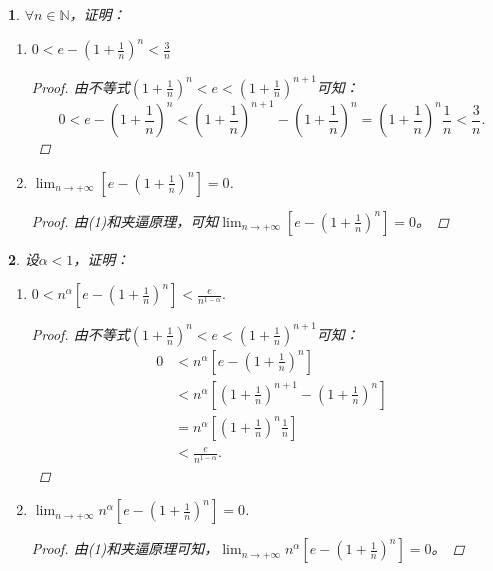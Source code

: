 \documentclass[utf8]{book}
\newtheorem{example}{}[section]             %
\begin{document}
\begin{example}
$\forall n\in\mathbb{N}$，证明：
\renewcommand\labelenumi{\normalfont(\theenumi)}
\begin{enumerate}
\item $0<e-\left(1+\frac{1}{n}\right)^n <\frac{3}{n}$
\begin{proof}
由不等式$\left(1+\frac{1}{n}\right)^n<e<\left(1+\frac{1}{n}\right)^{n+1}$可知：
$$0<e-\left(1+\frac{1}{n}\right)^n < \left(1+\frac{1}{n}\right)^{n+1} - \left(1+\frac{1}{n}\right)^{n}=\left(1+\frac{1}{n}\right)^{n}\frac{1}{n}<\frac{3}{n}.$$
\end{proof}
\item $\displaystyle \lim_{n\to +\infty}\left[e-\left(1+\frac{1}{n}\right)^n\right]=0$.
\begin{proof}
由(1)和夹逼原理，可知$\displaystyle \lim_{n\to +\infty}\left[e-\left(1+\frac{1}{n}\right)^n\right] = 0$。
\end{proof}
\end{enumerate}
\end{example}
\begin{example}
设$\alpha<1$，证明：
\renewcommand\labelenumi{\normalfont(\theenumi)}
\begin{enumerate}
\item $\displaystyle  0< n^{\alpha}\left[e-\left(1+\frac{1}{n}\right)^n\right] < \frac{e}{n^{1-\alpha}}.$
\begin{proof}
由不等式$\left(1+\frac{1}{n}\right)^n<e<\left(1+\frac{1}{n}\right)^{n+1}$可知：
\begin{equation*}
\begin{split}
0 &< n^{\alpha}\left[e-\left(1+\frac{1}{n}\right)^n\right] \\
&< n^{\alpha}\left[\left(1+\frac{1}{n}\right)^{n+1}-\left(1+\frac{1}{n}\right)^n\right] \\
&=n^{\alpha}\left[\left(1+\frac{1}{n}\right)^n\frac{1}{n}\right] \\&<\frac{e}{n^{1-\alpha}}.
\end{split}
\end{equation*}
\end{proof}
\item $\displaystyle  \lim_{n\to +\infty}n^{\alpha}\left[e-\left(1+\frac{1}{n}\right)^n\right] = 0$.
\begin{proof}
由(1)和夹逼原理可知，$\displaystyle  \lim_{n\to +\infty}n^{\alpha}\left[e-\left(1+\frac{1}{n}\right)^n\right] = 0$。
\end{proof}
\end{enumerate}
\end{example}
\end{document}
